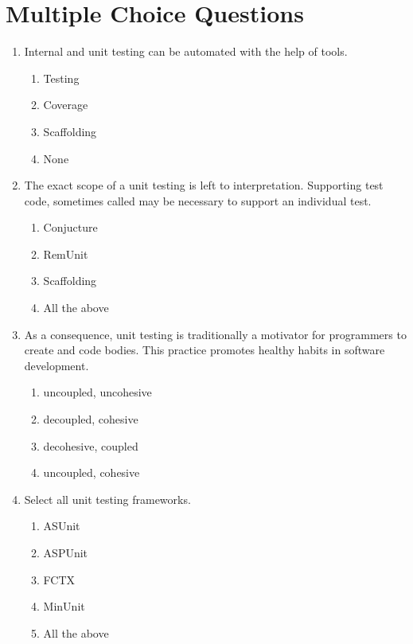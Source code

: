 \documentclass[11pt,a4paper]{article}
\begin{document}
\section*{Multiple Choice Questions}
\begin{enumerate}
\item Internal and unit testing can be automated with the help of  \underline{\hspace{2cm}} tools.
\begin{enumerate}
\item Testing
\item Coverage
\item Scaffolding
\item None
\end{enumerate}
\item The exact scope of a unit testing is left to interpretation. Supporting test code, sometimes called  \underline{\hspace{2cm}} may be necessary to support an individual test.
\begin{enumerate}
\item Conjucture
\item RemUnit
\item Scaffolding
\item All the above
\end{enumerate}
\item As a consequence, unit testing is traditionally a motivator for programmers to create  \underline{\hspace{2cm}} and  \underline{\hspace{2cm}} code bodies. This practice promotes healthy habits in software development.
\begin{enumerate}
\item uncoupled, uncohesive
\item decoupled, cohesive
\item decohesive, coupled
\item uncoupled, cohesive
\end{enumerate}
\item Select all unit testing frameworks.
\begin{enumerate}
\item ASUnit
\item ASPUnit
\item FCTX
\item MinUnit
\item All the above
\end{enumerate}
\end{enumerate}
\end{document}

